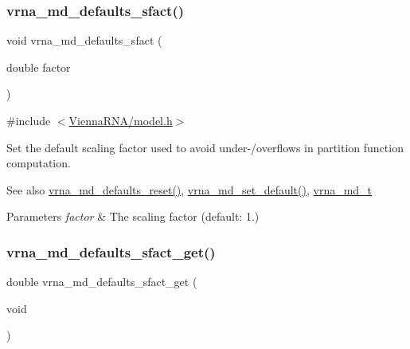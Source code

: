 \subsubsection{\texorpdfstring{vrna\_md\_defaults\_sfact()}{vrna\_md\_defaults\_sfact()}}
{\footnotesize\ttfamily void vrna\+\_\+md\+\_\+defaults\+\_\+sfact (\begin{DoxyParamCaption}\item[{double}]{factor }\end{DoxyParamCaption})}



{\ttfamily \#include $<$\mbox{\hyperlink{model_8h}{Vienna\+R\+N\+A/model.\+h}}$>$}



Set the default scaling factor used to avoid under-\//overflows in partition function computation. 

\begin{DoxySeeAlso}{See also}
\mbox{\hyperlink{group__model__details_ga70834424cf804d149937de89f80ceb45}{vrna\+\_\+md\+\_\+defaults\+\_\+reset()}}, \mbox{\hyperlink{group__model__details_ga8ac6ff84936282436f822644bf841f66}{vrna\+\_\+md\+\_\+set\+\_\+default()}}, \mbox{\hyperlink{group__model__details_ga1f8a10e12a0a1915f2a4eff0b28ea17c}{vrna\+\_\+md\+\_\+t}} 
\end{DoxySeeAlso}

\begin{DoxyParams}{Parameters}
{\em factor} & The scaling factor (default\+: 1.) \\
\hline
\end{DoxyParams}
\mbox{\label{group__model__details_gab2df6aab954b63fd3592d18e90285dae}} 
\subsubsection{\texorpdfstring{vrna\_md\_defaults\_sfact\_get()}{vrna\_md\_defaults\_sfact\_get()}}
{\footnotesize\ttfamily double vrna\+\_\+md\+\_\+defaults\+\_\+sfact\+\_\+get (\begin{DoxyParamCaption}\item[{void}]{ }\end{DoxyParamCaption})}



